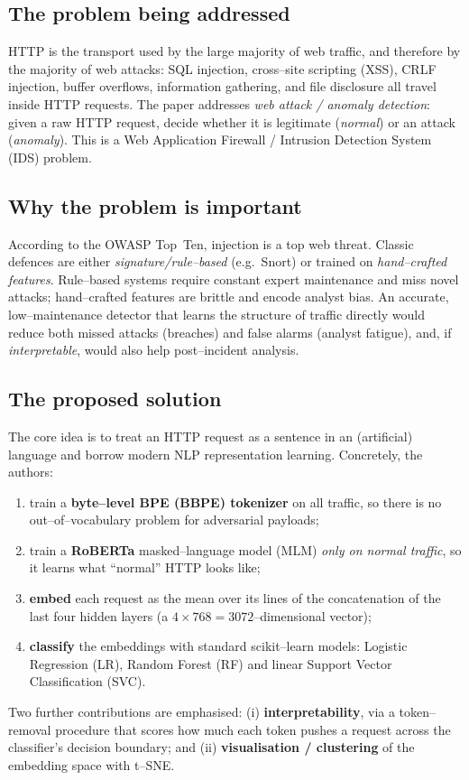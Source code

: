 \documentclass[11pt,a4paper]{article}
\begin{document}
\subsection{The problem being addressed}
HTTP is the transport used by the large majority of web traffic, and therefore by the
majority of web attacks: SQL injection, cross--site scripting (XSS), CRLF injection,
buffer overflows, information gathering, and file disclosure all travel inside HTTP
requests. The paper addresses \emph{web attack / anomaly detection}: given a raw HTTP
request, decide whether it is legitimate (\emph{normal}) or an attack (\emph{anomaly}).
This is a Web Application Firewall / Intrusion Detection System (IDS) problem.

\subsection{Why the problem is important}
According to the OWASP Top~Ten, injection is a top web threat. Classic defences are
either \emph{signature/rule--based} (e.g.\ Snort) or trained on \emph{hand--crafted
features}. Rule--based systems require constant expert maintenance and miss novel
attacks; hand--crafted features are brittle and encode analyst bias. An accurate,
low--maintenance detector that learns the structure of traffic directly would reduce
both missed attacks (breaches) and false alarms (analyst fatigue), and, if
\emph{interpretable}, would also help post--incident analysis.

\subsection{The proposed solution}
The core idea is to treat an HTTP request as a sentence in an (artificial) language and
borrow modern NLP representation learning. Concretely, the authors:
\begin{enumerate}[nosep,leftmargin=1.4em]
  \item train a \textbf{byte--level BPE (BBPE) tokenizer} on all traffic, so there is no
        out--of--vocabulary problem for adversarial payloads;
  \item train a \textbf{RoBERTa} masked--language model (MLM) \emph{only on normal
        traffic}, so it learns what ``normal'' HTTP looks like;
  \item \textbf{embed} each request as the mean over its lines of the concatenation of
        the last four hidden layers (a $4\times768=3072$--dimensional vector);
  \item \textbf{classify} the embeddings with standard scikit--learn models: Logistic
        Regression (LR), Random Forest (RF) and linear Support Vector Classification
        (SVC).
\end{enumerate}
Two further contributions are emphasised: (i) \textbf{interpretability}, via a
token--removal procedure that scores how much each token pushes a request across the
classifier's decision boundary; and (ii) \textbf{visualisation / clustering} of the
embedding space with t--SNE.
\end{document}
